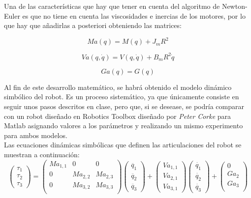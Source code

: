 Una de las características que hay que tener en cuenta del algoritmo de Newton-Euler es que no tiene en cuenta las viscosidades e inercias de los motores, por lo que hay que añadirlas a posteriori obteniendo las matrices:

\begin{equation}
Ma(q)=M(q)+J_mR^2
\end{equation}



\begin{equation}
Va(q,\dot{q})=V(q,\dot{q})+B_mR^2\dot{q}
\end{equation}



\begin{equation}
  Ga(q)=G(q)
\end{equation}

Al fin de este desarrollo matemático, se habrá obtenido el modelo dinámico simbólico del robot. Es un proceso sistemático, ya que únicamente consiste en seguir unos pasos descritos en clase, pero que, si se desease, se podría comparar con un robot diseñado en Robotics Toolbox diseñado por \textit{Peter Corke} para Matlab asignando valores a los parámetros y realizando un mismo experimento para ambos modelos.\\



Las ecuaciones dinámicas simbólicas que definen las articulaciones del robot se muestran a continuación: \\

\[
\begin{pmatrix}
\tau_{1} \\
\tau_{2} \\
\tau_{3}
\end{pmatrix} =
\begin{pmatrix}
Ma_{1,1} & 0 & 0\\
0 & Ma_{2,2} & Ma_{2,3}\\
0 & Ma_{3,2} & Ma_{3,3}\\
\end{pmatrix}
\begin{pmatrix}
\ddot{q_{1}} \\
\ddot{q_{2}}  \\
\ddot{q_{3}}
\end{pmatrix} +
\begin{pmatrix}
Va_{1,1}\\
Va_{2,1} \\
Va_{3,1}
\end{pmatrix}
\begin{pmatrix}
\dot{q_{1}} \\

\dot{q_{2}}  \\

\dot{q_{3}}
\end{pmatrix} +
\begin{pmatrix}
0\\
Ga_{2}\\
Ga_{3}\\
\end{pmatrix}\]




